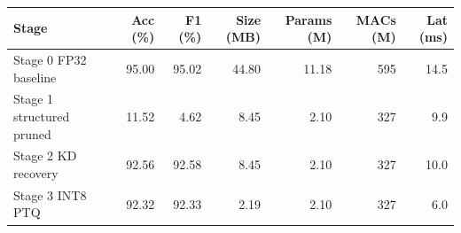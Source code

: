 \begin{tabular}{lrrrrrr}\toprule
Stage & Acc (\%) & F1 (\%) & Size (MB) & Params (M) & MACs (M) & Lat (ms)\\\midrule
Stage 0 FP32 baseline & 95.00 & 95.02 & 44.80 & 11.18 & 595 & 14.5\\
Stage 1 structured pruned & 11.52 & 4.62 & 8.45 & 2.10 & 327 & 9.9\\
Stage 2 KD recovery & 92.56 & 92.58 & 8.45 & 2.10 & 327 & 10.0\\
Stage 3 INT8 PTQ & 92.32 & 92.33 & 2.19 & 2.10 & 327 & 6.0\\
\bottomrule\end{tabular}